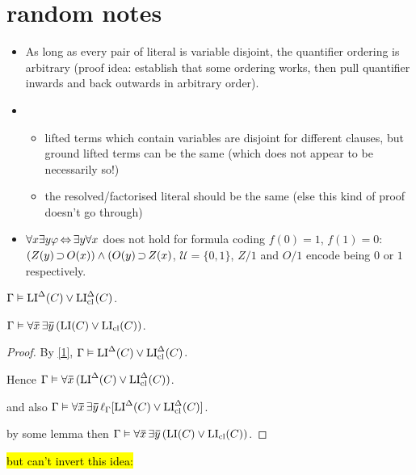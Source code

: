 \documentclass[,%
	draft=false,%
	numbers=noendperiod
	11pt,
	a4paper,
	oneside,%
	openany,
]{memoir}
\begin{document}
\tableofcontents

\section{random notes}

\begin{itemize}
	\item As long as every pair of literal is variable disjoint, the quantifier ordering is arbitrary (proof idea: establish that some ordering works, then pull quantifier inwards and back outwards in arbitrary order).
	\item

		\begin{itemize}
			\item lifted terms which contain variables are disjoint for different clauses,
				but ground lifted terms can be the same (which does not appear to be necessarily so!)
			\item  the resolved/factorised literal should be the same (else this kind of proof doesn't go through)
		\end{itemize}
	\item $\forall x \exists y \varphi \operatorname{\Leftrightarrow} \exists y \forall x  $ does not hold for formula coding $f(0) = 1$, $f(1) = 0$: $(Z(y) \operatorname{\supset} O(x))\land (O(y) \operatorname{\supset} Z(x)$, $\mathcal{U} = \{ 0, 1\}$, $Z/1$ and $O/1$ encode being $0$ or $1$ respectively.
\end{itemize}


\begin{lemma}
	\label{1}
	$\Gamma \vDash \operatorname{LI}^\Delta(C) \lor \operatorname{LI}_{\operatorname{cl}}^\Delta(C)$.
\end{lemma}

\begin{lemma}
	\label{2}
	$\Gamma \vDash \forall \bm\bar x\,\exists \bm\bar y\,(\operatorname{LI}(C) \lor \operatorname{LI}_{\operatorname{cl}}(C))$.
\end{lemma}
\begin{proof}
	By \ref{1}, 
	$\Gamma \vDash \operatorname{LI}^\Delta(C) \lor \operatorname{LI}_{\operatorname{cl}}^\Delta(C)$.

	Hence 
	$\Gamma \vDash \forall \bm\bar x\,( \operatorname{LI}^\Delta(C) \lor \operatorname{LI}_{\operatorname{cl}}^\Delta(C))$.

	and also 
	$\Gamma \vDash \forall \bm\bar x\,\exists \bm\bar y\,\ell_{\Gamma}[ \operatorname{LI}^\Delta(C) \lor \operatorname{LI}_{\operatorname{cl}}^\Delta(C)]$.

	by some lemma then
	$\Gamma \vDash \forall \bm\bar x\,\exists \bm\bar y\,(\operatorname{LI}(C) \lor \operatorname{LI}_{\operatorname{cl}}(C))$.
\end{proof}

\hl{but can't invert this idea:}
\end{document}
